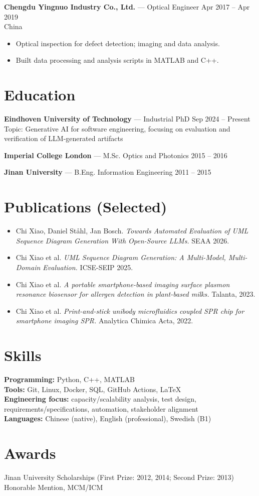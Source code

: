 \documentclass[11pt,a4paper]{article}
\begin{document}
\textbf{Chengdu Yingnuo Industry Co., Ltd.} — Optical Engineer \hfill Apr 2017 -- Apr 2019 \\
China
\begin{itemize}
  \item Optical inspection for defect detection; imaging and data analysis.
  \item Built data processing and analysis scripts in MATLAB and C++.
\end{itemize}

\section*{Education}
\textbf{Eindhoven University of Technology} — Industrial PhD \hfill Sep 2024 -- Present \\
Topic: Generative AI for software engineering, focusing on evaluation and verification of LLM-generated artifacts

\textbf{Imperial College London} — M.Sc. Optics and Photonics \hfill 2015 -- 2016

\textbf{Jinan University} — B.Eng. Information Engineering \hfill 2011 -- 2015


\section*{Publications (Selected)}
\begin{itemize}
  \item Chi Xiao, Daniel Ståhl, Jan Bosch. \textit{Towards Automated Evaluation of UML Sequence Diagram Generation With Open-Source LLMs.} SEAA 2026.
  \item Chi Xiao et al. \textit{UML Sequence Diagram Generation: A Multi-Model, Multi-Domain Evaluation.} ICSE-SEIP 2025.
  \item Chi Xiao et al. \textit{A portable smartphone-based imaging surface plasmon resonance biosensor for allergen detection in plant-based milks.} Talanta, 2023.
  \item Chi Xiao et al. \textit{Print-and-stick unibody microfluidics coupled SPR chip for smartphone imaging SPR.} Analytica Chimica Acta, 2022.
\end{itemize}

\section*{Skills}
\textbf{Programming:} Python, C++, MATLAB \\
\textbf{Tools:} Git, Linux, Docker, SQL, GitHub Actions, LaTeX \\
\textbf{Engineering focus:} capacity/scalability analysis, test design, requirements/specifications, automation, stakeholder alignment \\
\textbf{Languages:} Chinese (native), English (professional), Swedish (B1)

\section*{Awards}
Jinan University Scholarships (First Prize: 2012, 2014; Second Prize: 2013) \\
Honorable Mention, MCM/ICM
\end{document}
